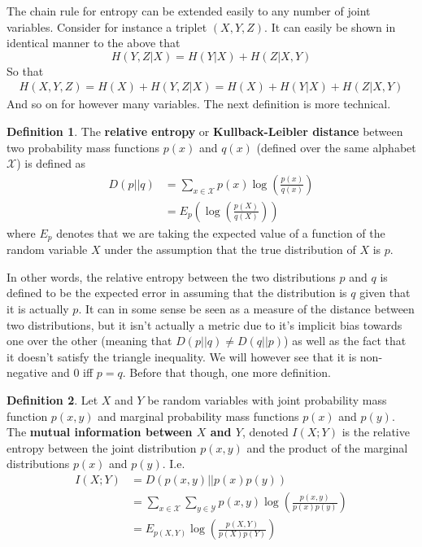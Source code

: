 \documentclass{article}
\theoremstyle{definition}
\newtheorem{definition}{Definition}[section]
\theoremstyle{plain}
\begin{document}
The chain rule for entropy can be extended easily to any number of joint variables. Consider for instance a triplet $(X,Y,Z)$. It can easily be shown in identical manner to the above that
\[ H(Y,Z|X) = H(Y|X) + H(Z|X,Y) \]
So that
\begin{align} 
	H(X,Y,Z) = H(X) + H(Y,Z|X) = H(X) + H(Y|X) + H(Z|X,Y)
\end{align}
And so on for however many variables. 
The next definition is more technical.
\begin{definition}
	The \textbf{relative entropy} or \textbf{Kullback-Leibler distance} between two probability mass functions $p(x)$ and $q(x)$ (defined over the same alphabet $\mathcal{X}$) is defined as 
	\begin{align}
		D(p||q) &= \sum_{x \in \mathcal{X}} p(x) \log\left( \frac{p(x)}{q(x)} \right) \\
		&= E_p\left(\log\left(\frac{p(X)}{q(X)} \right)\right)
	\end{align}
where $E_p$ denotes that we are taking the expected value of a function of the random variable $X$ under the assumption that the true distribution of $X$ is $p$. 
\end{definition}
In other words, the relative entropy between the two distributions $p$ and $q$ is defined to be the expected error in assuming that the distribution is $q$ given that it is actually $p$. It can in some sense be seen as a measure of the distance between two distributions, but it isn't actually a metric due to it's implicit bias towards one over the other (meaning that $D(p||q) \neq D(q||p)$) as well as the fact that it doesn't satisfy the triangle inequality. We will however see that it is non-negative and $0$ iff $p = q$. Before that though, one more definition.
\begin{definition}
	Let $X$ and $Y$ be random variables with joint probability mass function $p(x,y)$ and marginal probability mass functions $p(x)$ and $p(y)$. The \textbf{mutual information between $X$ and $Y$}, denoted $I(X;Y)$ is the relative entropy between the joint distribution $p(x,y)$ and the product of the marginal distributions $p(x)$ and $p(y)$. I.e. 
	\begin{align}
		I(X;Y) &= D(p(x,y)||p(x)p(y)) \\
			&= \sum_{x \in \mathcal{X}}\sum_{y \in \mathcal{Y}} p(x,y)\log\left( \frac{p(x,y)}{p(x)p(y)} \right) \\
			&= E_{p(X,Y)}\log\left( \frac{p(X,Y)}{p(X)p(Y)} \right) 
	\end{align}
\end{definition}
\end{document}
